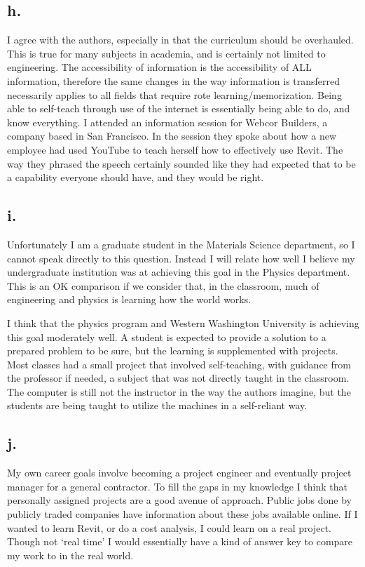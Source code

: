 \documentclass[12pt]{article}
\renewcommand{\=}[1]{\stackrel{#1}{=}} %
\theoremstyle{definition}
\theoremstyle{remark}
\begin{document}
\subsection{h.}
I agree with the authors, especially in that the curriculum should be overhauled. This is true for many subjects in academia, and is certainly not limited to engineering. The accessibility of information is the accessibility of ALL information, therefore the same changes in the way information is transferred necessarily applies to all fields that require rote learning/memorization. Being able to self-teach through use of the internet is essentially being able to do, and know everything. I attended an information session for Webcor Builders, a company based in San Francisco. In the session they spoke about how a new employee had used YouTube to teach herself how to effectively use Revit. The way they phrased the speech certainly sounded like they had expected that to be a capability everyone should have, and they would be right.

\subsection{i.}
Unfortunately I am a graduate student in the Materials Science department, so I cannot speak directly to this question. Instead I will relate how well I believe my undergraduate institution was at achieving this goal in the Physics department. This is an OK comparison if we consider that, in the classroom, much of engineering and physics is learning how the world works. 

I think that the physics program and Western Washington University is achieving this goal moderately well. A student is expected to provide a solution to a prepared problem to be sure, but the learning is supplemented with projects. Most classes had a small project that involved self-teaching, with guidance from the professor if needed, a subject that was not directly taught in the classroom. The computer is still not the instructor in the way the authors imagine, but the students are being taught to utilize the machines in a self-reliant way.

\subsection{j.}
My own career goals involve becoming a project engineer and eventually project manager for a general contractor. To fill the gaps in my knowledge I think that personally assigned projects are a good avenue of approach. Public jobs done by publicly traded companies have information about these jobs available online. If I wanted to learn Revit, or do a cost analysis, I could learn on a real project. Though not ‘real time’ I would essentially have a kind of answer key to compare my work to in the real world.
\end{document}
